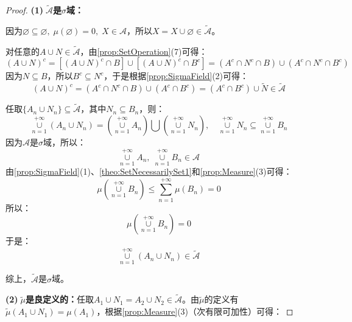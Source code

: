 \begin{proof}
	\textbf{(1)$\;\tilde{\mathscr{A}}$是$\sigma$域：}\par
	因为$\varnothing\subseteq\varnothing,\;\mu(\varnothing)=0,\;X\in\mathscr{A}$，所以$X=X\cup\varnothing\in\tilde{\mathscr{A}}$。\par
	对任意的$A\cup N\in\tilde{\mathscr{A}}$，由\cref{prop:SetOperation}(7)可得：
	\begin{equation*}
		(A\cup N)^c=[(A\cup N)^c\cap B]\cup[(A\cup N)^c\cap B^c]=(A^c\cap N^c\cap B)\cup(A^c\cap N^c\cap B^c)
	\end{equation*}
	因为$N\subseteq B$，所以$B^c\subseteq N^c$，于是根据\cref{prop:SigmaField}(2)可得：
	\begin{equation*}
		(A\cup N)^c=(A^c\cap N^c\cap B)\cup(A^c\cap B^c)=(A^c\cap B^c)\cup\tilde{N}\in\tilde{\mathscr{A}}
	\end{equation*}\par
	任取$\{A_n\cup N_n\}\subseteq\tilde{\mathscr{A}}$，其中$N_n\subseteq B_n$，则：
	\begin{equation*}
		\underset{n=1}{\overset{+\infty}{\cup}}(A_n\cup N_n)=\left(\underset{n=1}{\overset{+\infty}{\cup}}A_n\right)\bigcup\left(\underset{n=1}{\overset{+\infty}{\cup}}N_n\right),\quad\underset{n=1}{\overset{+\infty}{\cup}}N_n\subseteq\underset{n=1}{\overset{+\infty}{\cup}}B_n
	\end{equation*}
	因为$\mathscr{A}$是$\sigma$域，所以：
	\begin{equation*}
		\underset{n=1}{\overset{+\infty}{\cup}}A_n,\;\underset{n=1}{\overset{+\infty}{\cup}}B_n\in\mathscr{A}
	\end{equation*}
	由\cref{prop:SigmaField}(1)、\cref{theo:SetNecessarilySet1}和\cref{prop:Measure}(3)可得：
	\begin{equation*}
		\mu\left(\underset{n=1}{\overset{+\infty}{\cup}}B_n\right)\leqslant\sum_{n=1}^{+\infty}\mu(B_n)=0
	\end{equation*}
	所以：
	\begin{equation*}
		\mu\left(\underset{n=1}{\overset{+\infty}{\cup}}B_n\right)=0
	\end{equation*}
	于是：
	\begin{equation*}
		\underset{n=1}{\overset{+\infty}{\cup}}(A_n\cup N_n)\in\tilde{\mathscr{A}}
	\end{equation*}\par
	综上，$\tilde{\mathscr{A}}$是$\sigma$域。\par
	\textbf{(2)$\;\tilde{\mu}$是良定义的：}任取$A_1\cup N_1=A_2\cup N_2\in\tilde{\mathscr{A}}$。由$\tilde{\mu}$的定义有$\tilde{\mu}(A_1\cup N_1)=\mu(A_1)$，根据\cref{prop:Measure}(3)（次有限可加性）可得：

\end{proof}
